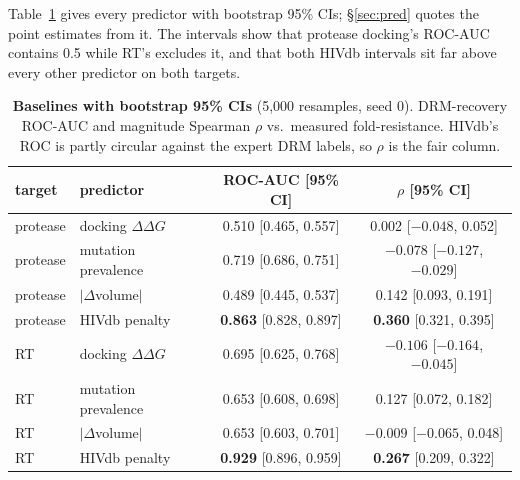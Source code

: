 \documentclass{article}
\newcommand{\ddg}{\ensuremath{\Delta\Delta G}}
\newcommand{\rhoo}{\ensuremath{\rho}}
\begin{document}
Table~\ref{tab:baselineci} gives every predictor with bootstrap 95\% CIs; \S\ref{sec:pred}
quotes the point estimates from it. The intervals show that protease docking's ROC-AUC
contains 0.5 while RT's excludes it, and that both HIVdb intervals sit far above
every other predictor on both targets.

\begin{table}[h]
\centering
\caption{\textbf{Baselines with bootstrap 95\% CIs} (5{,}000 resamples, seed 0). DRM-recovery ROC-AUC and magnitude Spearman \rhoo{} vs.\ measured fold-resistance. HIVdb's ROC is partly circular against the expert DRM labels, so \rhoo{} is the fair column.}
\label{tab:baselineci}
\begin{tabular}{llcc}
\toprule
target & predictor & ROC-AUC [95\% CI] & \rhoo{} [95\% CI] \\
\midrule
protease & docking \ddg{}      & 0.510 [0.465, 0.557] & 0.002 [$-0.048$, 0.052] \\
protease & mutation prevalence & 0.719 [0.686, 0.751] & $-0.078$ [$-0.127$, $-0.029$] \\
protease & $|\Delta$volume$|$  & 0.489 [0.445, 0.537] & 0.142 [0.093, 0.191] \\
protease & HIVdb penalty       & \textbf{0.863} [0.828, 0.897] & \textbf{0.360} [0.321, 0.395] \\
\midrule
RT & docking \ddg{}      & 0.695 [0.625, 0.768] & $-0.106$ [$-0.164$, $-0.045$] \\
RT & mutation prevalence & 0.653 [0.608, 0.698] & 0.127 [0.072, 0.182] \\
RT & $|\Delta$volume$|$  & 0.653 [0.603, 0.701] & $-0.009$ [$-0.065$, 0.048] \\
RT & HIVdb penalty       & \textbf{0.929} [0.896, 0.959] & \textbf{0.267} [0.209, 0.322] \\
\bottomrule
\end{tabular}
\end{table}
\end{document}
